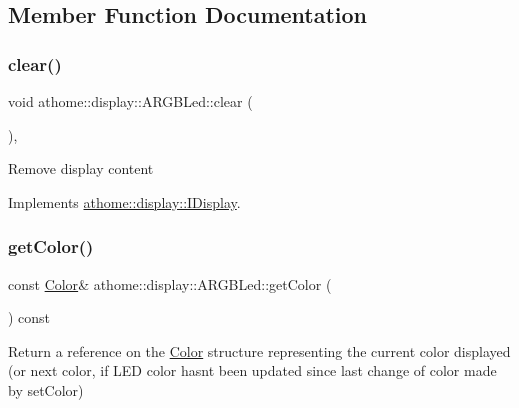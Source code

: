 \subsection{Member Function Documentation}
\mbox{\label{classathome_1_1display_1_1_a_r_g_b_led_a9753e3a23ea5cb6b0a41079bc6128766}} 
\subsubsection{\texorpdfstring{clear()}{clear()}}
{\footnotesize\ttfamily void athome\+::display\+::\+A\+R\+G\+B\+Led\+::clear (\begin{DoxyParamCaption}{ }\end{DoxyParamCaption})\hspace{0.3cm}{\ttfamily [inline]}, {\ttfamily [virtual]}}

Remove display content 

Implements \mbox{\hyperlink{classathome_1_1display_1_1_i_display_a0d3add1ce61c96657827fb56d250d9c6}{athome\+::display\+::\+I\+Display}}.

\mbox{\label{classathome_1_1display_1_1_a_r_g_b_led_a2c3022a5aad43595fefc4b52d916467a}} 
\subsubsection{\texorpdfstring{get\+Color()}{getColor()}}
{\footnotesize\ttfamily const \mbox{\hyperlink{structathome_1_1display_1_1_a_r_g_b_led_1_1_color}{Color}}\& athome\+::display\+::\+A\+R\+G\+B\+Led\+::get\+Color (\begin{DoxyParamCaption}{ }\end{DoxyParamCaption}) const\hspace{0.3cm}{\ttfamily [inline]}}

Return a reference on the \mbox{\hyperlink{structathome_1_1display_1_1_a_r_g_b_led_1_1_color}{Color}} structure representing the current color displayed (or next color, if L\+ED color hasn\textquotesingle{}t been updated since last change of color made by set\+Color)

